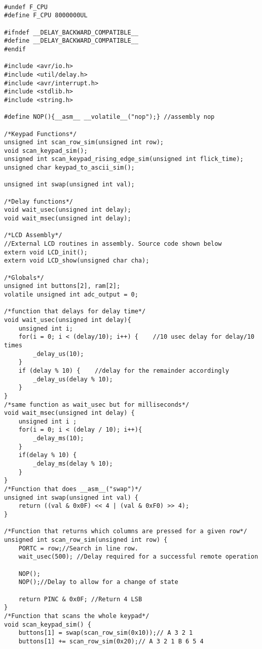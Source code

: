 \documentclass{article}
\begin{document}
\begin{verbatim}

#undef F_CPU
#define F_CPU 8000000UL

#ifndef __DELAY_BACKWARD_COMPATIBLE__
#define __DELAY_BACKWARD_COMPATIBLE__
#endif

#include <avr/io.h>
#include <util/delay.h>
#include <avr/interrupt.h>
#include <stdlib.h>
#include <string.h>

#define NOP(){__asm__ __volatile__("nop");} //assembly nop

/*Keypad Functions*/
unsigned int scan_row_sim(unsigned int row);
void scan_keypad_sim();
unsigned int scan_keypad_rising_edge_sim(unsigned int flick_time);
unsigned char keypad_to_ascii_sim();

unsigned int swap(unsigned int val);

/*Delay functions*/
void wait_usec(unsigned int delay);
void wait_msec(unsigned int delay);

/*LCD Assembly*/
//External LCD routines in assembly. Source code shown below
extern void LCD_init();
extern void LCD_show(unsigned char cha);

/*Globals*/
unsigned int buttons[2], ram[2];
volatile unsigned int adc_output = 0;

/*function that delays for delay time*/
void wait_usec(unsigned int delay){
	unsigned int i;
	for(i = 0; i < (delay/10); i++) {    //10 usec delay for delay/10 times
		_delay_us(10);
	}
	if (delay % 10) {    //delay for the remainder accordingly
		_delay_us(delay % 10);
	}
}
/*same function as wait_usec but for milliseconds*/
void wait_msec(unsigned int delay) {
	unsigned int i ;
	for(i = 0; i < (delay / 10); i++){
		_delay_ms(10);
	}
	if(delay % 10) {
		_delay_ms(delay % 10);
	}
}
/*Function that does __asm__("swap")*/
unsigned int swap(unsigned int val) {
	return ((val & 0x0F) << 4 | (val & 0xF0) >> 4);
}

/*Function that returns which columns are pressed for a given row*/
unsigned int scan_row_sim(unsigned int row) {
	PORTC = row;//Search in line row.
	wait_usec(500); //Delay required for a successful remote operation
	
	NOP();
	NOP();//Delay to allow for a change of state
	
	return PINC & 0x0F; //Return 4 LSB
}
/*Function that scans the whole keypad*/
void scan_keypad_sim() {
	buttons[1] = swap(scan_row_sim(0x10));// A 3 2 1
	buttons[1] += scan_row_sim(0x20);// A 3 2 1 B 6 5 4


\end{verbatim}
\end{document}
